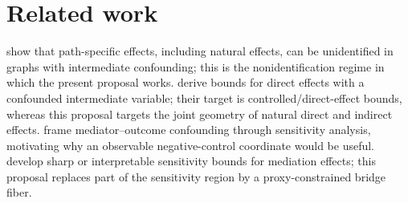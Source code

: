 \documentclass[11pt]{article}
\theoremstyle{definition}
\theoremstyle{plain}
\theoremstyle{remark}
\begin{document}
\section{Related work}
\citet{AvinShpitserPearl2005} show that path-specific effects, including
natural effects, can be unidentified in graphs with intermediate confounding;
this is the nonidentification regime in which the present proposal works.
\citet{CaiKurokiPearlTian2008} derive bounds for direct effects with a
confounded intermediate variable; their target is controlled/direct-effect
bounds, whereas this proposal targets the joint geometry of natural direct and
indirect effects.  \citet{ImaiKeeleYamamoto2010} frame mediator--outcome
confounding through sensitivity analysis, motivating why an observable
negative-control coordinate would be useful.  \citet{DingVanderWeele2016}
develop sharp or interpretable sensitivity bounds for mediation effects; this
proposal replaces part of the sensitivity region by a proxy-constrained bridge
fiber.
\end{document}

